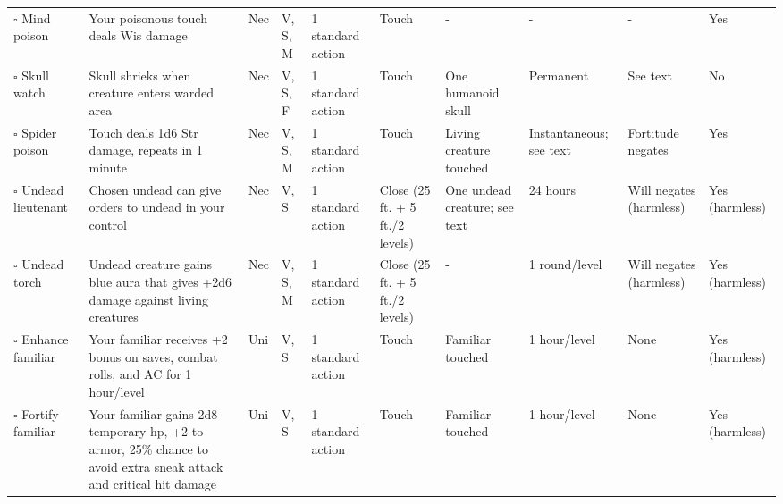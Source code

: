 \documentclass[12pt, a4paper]{article}
\begin{document}
\begin{center}
\begin{longtable}[H]{ p{8em} p{15em} p{2em} p{5em} p{6em} p{6em} p{10em} p{6em} p{5em} p{2em} }
    \(\square\) Mind poison & Your poisonous touch deals Wis damage & Nec & V, S, M & 1 standard action & Touch & - & - & - & Yes\\
    \(\square\) Skull watch & Skull shrieks when creature enters warded area & Nec & V, S, F & 1 standard action & Touch & One humanoid skull & Permanent & See text & No\\
    \(\square\) Spider poison & Touch deals 1d6 Str damage, repeats in 1 minute & Nec & V, S, M & 1 standard action & Touch & Living creature touched & Instantaneous; see text & Fortitude negates & Yes\\
    \(\square\) Undead lieutenant & Chosen undead can give orders to undead in your control & Nec & V, S & 1 standard action & Close (25 ft. + 5 ft./2 levels) & One undead creature; see text & 24 hours & Will negates (harmless) & Yes (harmless)\\
    \(\square\) Undead torch & Undead creature gains blue aura that gives +2d6 damage against living creatures & Nec & V, S, M & 1 standard action & Close (25 ft. + 5 ft./2 levels) & - & 1 round/level & Will negates (harmless) & Yes (harmless)\\
    \(\square\) Enhance familiar & Your familiar receives +2 bonus on saves, combat rolls, and AC for 1 hour/level & Uni & V, S & 1 standard action & Touch & Familiar touched & 1 hour/level & None & Yes (harmless)\\
    \(\square\) Fortify familiar & Your familiar gains 2d8 temporary hp, +2 to armor, 25\% chance to avoid extra sneak attack and critical hit damage & Uni & V, S & 1 standard action & Touch & Familiar touched & 1 hour/level & None & Yes (harmless)\\
  \end{longtable}


\end{center}
\end{document}
